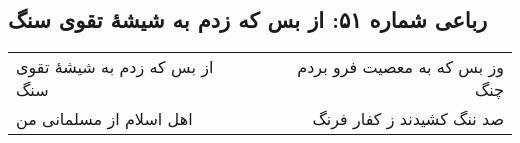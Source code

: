 \begin{center}
\section*{رباعی شماره ۵۱: از بس که زدم به شیشهٔ تقوی سنگ}
\label{sec:051}
\begin{longtable}{l p{0.5cm} r}
از بس که زدم به شیشهٔ تقوی سنگ
&&
وز بس که به معصیت فرو بردم چنگ
\\
اهل اسلام از مسلمانی من
&&
صد ننگ کشیدند ز کفار فرنگ
\\
\end{longtable}
\end{center}
